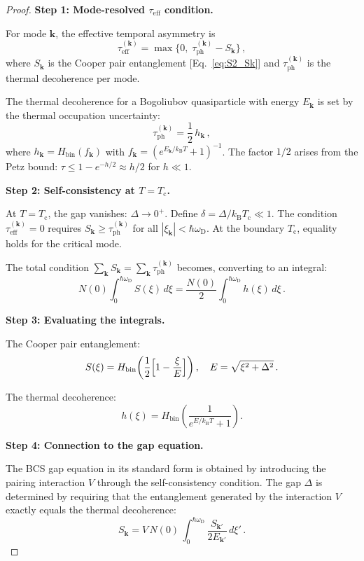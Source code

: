 \documentclass[prb,twocolumn,superscriptaddress,longbibliography,floatfix]{revtex4-2}
\newcommand{\kB}{k_{\mathrm{B}}}
\newcommand{\tauasym}{\tau}
\newcommand{\taueff}{\tauasym_{\mathrm{eff}}}
\newcommand{\taudec}{\tauasym_{\mathrm{ph}}}
\newcommand{\Tc}{T_{\mathrm{c}}}
\newcommand{\oD}{\omega_{\mathrm{D}}}
\newcommand{\Ek}{E_{\bm{k}}}
\newcommand{\xik}{\xi_{\bm{k}}}
\begin{document}
\begin{proof}
\textbf{Step 1: Mode-resolved $\taueff$ condition.}

For mode $\bm{k}$, the effective temporal asymmetry is
\begin{equation}
  \taueff^{(\bm{k})} = \max\{0,\; \taudec^{(\bm{k})} - S_{\bm{k}}\}\,,
\end{equation}
where $S_{\bm{k}}$ is the Cooper pair entanglement
[Eq.~\eqref{eq:S2_Sk}] and $\taudec^{(\bm{k})}$ is the
thermal decoherence per mode.

The thermal decoherence for a Bogoliubov quasiparticle with
energy $\Ek$ is set by the thermal occupation uncertainty:
\begin{equation}
  \taudec^{(\bm{k})} = \frac{1}{2}\, h_{\bm{k}}\,,
\end{equation}
where $h_{\bm{k}} = H_{\mathrm{bin}}(f_{\bm{k}})$
with $f_{\bm{k}} = (e^{\Ek/\kB T} + 1)^{-1}$.
The factor $1/2$ arises from the Petz bound:
$\tauasym \leq 1 - e^{-h/2} \approx h/2$ for $h \ll 1$.

\textbf{Step 2: Self-consistency at $T = \Tc$.}

At $T = \Tc$, the gap vanishes: $\Delta \to 0^+$.
Define $\delta = \Delta/\kB\Tc \ll 1$.  The condition
$\taueff^{(\bm{k})} = 0$ requires $S_{\bm{k}} \geq \taudec^{(\bm{k})}$
for all $|\xik| < \hbar\oD$.  At the boundary $\Tc$, equality holds
for the critical mode.

The total condition $\sum_{\bm{k}} S_{\bm{k}} = \sum_{\bm{k}} \taudec^{(\bm{k})}$ becomes, converting to an integral:
\begin{equation}\label{eq:S3_integral}
  N(0)\int_0^{\hbar\oD} S(\xi)\, d\xi
  = \frac{N(0)}{2}\int_0^{\hbar\oD} h(\xi)\, d\xi\,.
\end{equation}

\textbf{Step 3: Evaluating the integrals.}

The Cooper pair entanglement:
\begin{equation}
  S(\xi) = H_{\mathrm{bin}}\!\left(\frac{1}{2}\Bigl[1 - \frac{\xi}{E}\Bigr]\right),
  \quad E = \sqrt{\xi^2 + \Delta^2}\,.
\end{equation}

The thermal decoherence:
\begin{equation}
  h(\xi) = H_{\mathrm{bin}}\!\left(\frac{1}{e^{E/\kB T} + 1}\right).
\end{equation}

\textbf{Step 4: Connection to the gap equation.}

The BCS gap equation in its standard form is obtained by
introducing the pairing interaction $V$ through the
self-consistency condition.  The gap $\Delta$ is determined by
requiring that the entanglement generated by the interaction
$V$ exactly equals the thermal decoherence:
\begin{equation}
  S_{\bm{k}} = V\, N(0)\, \int_0^{\hbar\oD}
  \frac{S_{\bm{k}'}}{2E_{\bm{k}'}}\, d\xi'\,.
\end{equation}


\end{proof}
\end{document}
